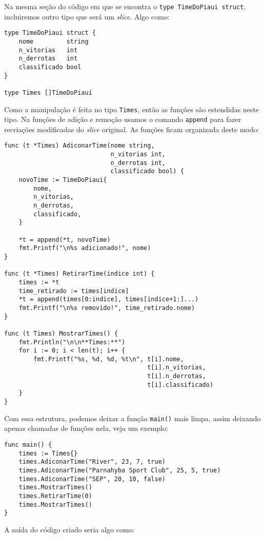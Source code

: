 \documentclass{SBCbookchapter}
\begin{document}
Na mesma seção do código em que se encontra o \texttt{type TimeDoPiaui struct}, incluiremos outro tipo que será um \textit{slice}. Algo como:

\begin{lstlisting}
type TimeDoPiaui struct {
	nome         string
	n_vitorias   int
	n_derrotas   int
	classificado bool
}

type Times []TimeDoPiaui
\end{lstlisting}

Como a manipulação é feita no tipo \texttt{Times}, então as funções são estendidas neste tipo. Na funções de adição e remoção usamos o comando \texttt{append} para fazer recriações modificadas do \textit{slice} original. As funções ficam organizada deste modo:

\begin{lstlisting}
func (t *Times) AdiconarTime(nome string,
							 n_vitorias int,
							 n_derrotas int,
							 classificado bool) {
	novoTime := TimeDoPiaui{
		nome,
		n_vitorias,
		n_derrotas,
		classificado,
	}

	*t = append(*t, novoTime)
	fmt.Printf("\n%s adicionado!", nome)
}

func (t *Times) RetirarTime(indice int) {
	times := *t
	time_retirado := times[indice]
	*t = append(times[0:indice], times[indice+1:]...)
	fmt.Printf("\n%s removido!", time_retirado.nome)
}

func (t Times) MostrarTimes() {
	fmt.Println("\n\n**Times:**")
	for i := 0; i < len(t); i++ {
		fmt.Printf("%s, %d, %d, %t\n", t[i].nome,
									   t[i].n_vitorias,
									   t[i].n_derrotas,
									   t[i].classificado)
	}
}
\end{lstlisting}

Com essa estrutura, podemos deixar a função \texttt{main()} mais limpa, assim deixando apenas chamadas de funções nela, veja um exemplo:

\begin{lstlisting}
func main() {
	times := Times{}
	times.AdiconarTime("River", 23, 7, true)
	times.AdiconarTime("Parnahyba Sport Club", 25, 5, true)
	times.AdiconarTime("SEP", 20, 10, false)
	times.MostrarTimes()
	times.RetirarTime(0)
	times.MostrarTimes()
}
\end{lstlisting}

A saída do código criado seria algo como:
\end{document}
